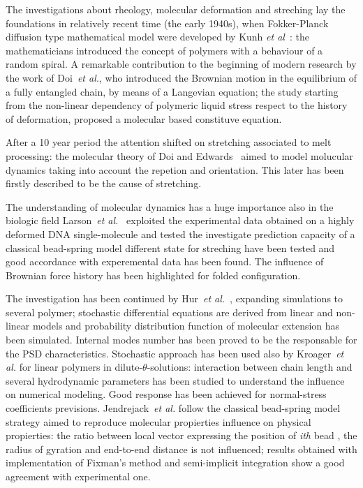 The investigations about rheology, molecular deformation and streching lay the foundations in relatively recent time (the early 1940s), when Fokker-Planck diffusion type mathematical model were developed by Kunh \emph{et al}~\cite{kuhn}: the mathematicians introduced the concept of polymers with a behaviour of  a random spiral. A remarkable contribution to the beginning of modern research by the work of Doi~\emph{et al.}\cite{doi2}, who introduced the Brownian motion in the equilibrium of a fully entangled chain, by means of a Langevian equation; the study starting from the non-linear dependency of polymeric liquid stress respect to the history of deformation, proposed a molecular based constituve equation. 

After a 10 year period the attention shifted on stretching associated to melt processing: the molecular theory of Doi and Edwards~\cite{edwards} aimed to model molucular dynamics taking into account the repetion and orientation. This later has been firstly described to be the cause of stretching. 

The understanding of molecular dynamics has a huge importance also in the biologic field Larson~\emph{et al.}~\cite{hsieh}
exploited the experimental data obtained on a highly deformed DNA single-molecule
and tested the investigate prediction capacity of a classical bead-spring model different
state for streching have been tested and good accordance with experemental data has been found.
The influence of Brownian force history has been highlighted for folded configuration.

The investigation has been continued by Hur~\emph{et al.}~\cite{hur}, expanding simulations to several polymer; stochastic differential equations are derived from linear and non-linear models and probability distribution function of molecular extension has been simulated. Internal modes number has been proved to be the responsable for the PSD characteristics.
Stochastic approach has been used also by Kroager~\emph{et al.}\cite{kroger} for linear polymers in dilute-$\theta$-solutions: interaction between chain length and several hydrodynamic parameters has been studied to understand the influence on numerical modeling.
Good response has been achieved for normal-stress coefficients previsions.
Jendrejack~\emph{et al.}\cite{jendrejack} follow the classical bead-spring model strategy aimed to reproduce molecular propierties influence on physical propierties: the ratio between local vector expressing the position of \textit{ith} bead , the radius of gyration and end-to-end distance is not influenced; results obtained with implementation of Fixman's method and semi-implicit integration show a good agreement with experimental one.

